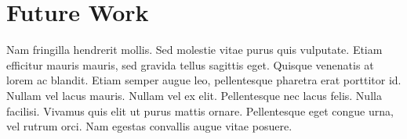 \section{Future Work}
Nam fringilla hendrerit mollis. Sed molestie vitae purus quis vulputate. Etiam efficitur mauris mauris, sed gravida tellus sagittis eget. Quisque venenatis at lorem ac blandit. Etiam semper augue leo, pellentesque pharetra erat porttitor id. Nullam vel lacus mauris. Nullam vel ex elit. Pellentesque nec lacus felis. Nulla facilisi. Vivamus quis elit ut purus mattis ornare. Pellentesque eget congue urna, vel rutrum orci. Nam egestas convallis augue vitae posuere.

\closepart

